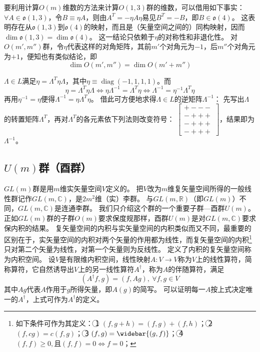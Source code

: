 要利用计算$O(m)$维数的方法来计算$O(1, 3)$群的维数，可以借用如下事实：
$\forall A \in \mathfrak{o}(1, 3)$，令$B \equiv \eta A$，则由$A^T = -\eta A \eta$易见$B^T = -B$，即$B \in \mathfrak{o}(4)$。
这表明存在从$\mathfrak{o}(1, 3)$到$\mathfrak{o}(4)$的映射，而且是（矢量空间之间的）同构映射，因而$\dim \mathfrak{o}(1, 3) = \dim \mathfrak{o}(4)$。
这一结论只依赖于$\eta$的对称性和非退化性。
对$O(m', m'')$群，令$\eta$代表这样的对角矩阵，其前$m'$个对角元为$-1$，后$m''$个对角元为$+1$，便知也有类似结论，即
$$\dim O(m', m'') = \dim O(m' + m'')$$

$\Lambda \in L$满足$\eta = \Lambda^T \eta \Lambda$，其中$\eta \equiv \operatorname{diag}(-1, 1, 1, 1)$。而
$$\eta = \Lambda^T \eta \Lambda \Leftrightarrow \eta \Lambda^{-1} = \Lambda^T \eta \Leftrightarrow \Lambda^{-1} = \eta^{-1}\Lambda^T\eta$$
再用$\eta^{-1} = \eta$便得$\Lambda^{-1} = \eta \Lambda^T \eta$。
借此可方便地求得$\Lambda \in L$的逆矩阵$\Lambda^{-1}$：
先写出$\Lambda$的转置矩阵$\Lambda^T$，再对$\Lambda^T$的各元素依下列法则改变符号：
$\begin{bmatrix}
    + - - - \\
    - + + + \\
    - + + + \\
    - + + +
\end{bmatrix}$，结果即为$\Lambda^{-1}$。


\subsection{$U(m)$群（酉群）}

$GL(m)$群是用$m$维实矢量空间$V$定义的。
把$V$改为$m$维复矢量空间所得的一般线性群记作$GL(m, \mathbb{C})$，是$2m^2$维（实）李群。
与$GL(m, \mathbb{R})$（即$GL(m)$）不同，$GL(m, \mathbb{C})$是连通李群。
我们只介绍这个群的一个重要子群---酉群$U(m)$。
正如$GL(m)$群的子群$O(m)$要求保度规那样，酉群$U(m)$是对$GL(m, \mathbb{C})$要求保内积的结果。
复矢量空间的内积与实矢量空间的内积类似而又不同，最重要的区别在于，实矢量空间的内积对两个矢量的作用都为线性，而复矢量空间的内积\footnote{
    如下条件可作为其定义：
    \textcircled{1} $(f, g + h) = (f, g) + (f, h)$；
    \textcircled{2} $(f, cg) = c(f, g)$；
    \textcircled{3} $(f, g) = \widebar{(g, f)}$；
    \textcircled{4} $(f, f) \geq 0, \text{且} (f, f) = 0 \Leftrightarrow f = 0$；
}只对第二个矢量为线性，对第一个矢量则为反线性。
定义了内积的复矢量空间称为内积空间。
设$V$是有限维内积空间，线性映射$A \colon V \to V$称为$V$上的线性算符，简称算符，它自然诱导出$V$上的另一线性算符$A^\dagger$，称为$A$的伴随算符，满足
$$(A^\dagger f, g) = (f, Ag), ~ \forall f, g \in V$$
其中$Ag$代表$A$作用于$g$所得矢量，即$A(g)$的简写。
可以证明每一$A$按上式决定唯一的$A^\dagger$，上式可作为$A^\dagger$的定义。

